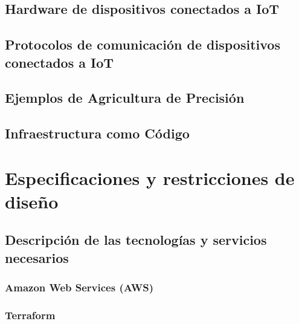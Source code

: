 \documentclass[12pt]{article}
\begin{document}
\subsection{Hardware de dispositivos conectados a IoT}


\subsection{Protocolos de comunicación de dispositivos conectados a IoT}


\subsection{Ejemplos de Agricultura de Precisión}


\subsection{Infraestructura como Código}


\section{Especificaciones y restricciones de diseño}


\subsection{Descripción de las tecnologías y servicios necesarios}


\subsubsection{Amazon Web Services (AWS)}


\subsubsection{Terraform}

\end{document}
